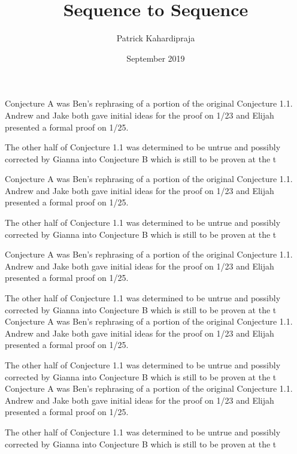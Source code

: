 \documentclass[12pt]{extarticle}
\title{Sequence to Sequence}
\author{Patrick Kahardipraja}
\date{September 2019}
\begin{document}
\linespread{1.25}
\maketitle

Conjecture A was Ben's rephrasing of a portion of the original Conjecture 1.1.  Andrew and Jake both gave initial ideas for the proof on 1/23 and Elijah presented a formal proof on 1/25.  

The other half of Conjecture 1.1 was determined to be untrue and possibly corrected by Gianna into Conjecture B which is still to be proven at the t

Conjecture A was Ben's rephrasing of a portion of the original Conjecture 1.1.  Andrew and Jake both gave initial ideas for the proof on 1/23 and Elijah presented a formal proof on 1/25.  

The other half of Conjecture 1.1 was determined to be untrue and possibly corrected by Gianna into Conjecture B which is still to be proven at the t

Conjecture A was Ben's rephrasing of a portion of the original Conjecture 1.1.  Andrew and Jake both gave initial ideas for the proof on 1/23 and Elijah presented a formal proof on 1/25.  

The other half of Conjecture 1.1 was determined to be untrue and possibly corrected by Gianna into Conjecture B which is still to be proven at the t
Conjecture A was Ben's rephrasing of a portion of the original Conjecture 1.1.  Andrew and Jake both gave initial ideas for the proof on 1/23 and Elijah presented a formal proof on 1/25.  

The other half of Conjecture 1.1 was determined to be untrue and possibly corrected by Gianna into Conjecture B which is still to be proven at the t
Conjecture A was Ben's rephrasing of a portion of the original Conjecture 1.1.  Andrew and Jake both gave initial ideas for the proof on 1/23 and Elijah presented a formal proof on 1/25.  

The other half of Conjecture 1.1 was determined to be untrue and possibly corrected by Gianna into Conjecture B which is still to be proven at the t
\end{document}
